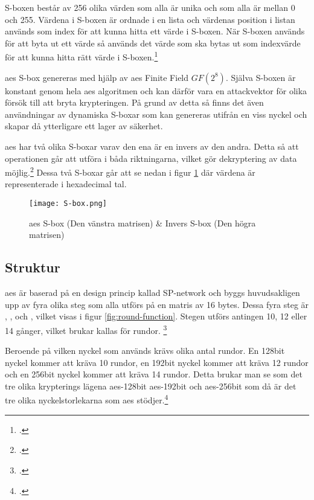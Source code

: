 S-boxen består av 256 olika värden som alla är unika och som alla är mellan 0 och 255.
Värdena i S-boxen är ordnade i en lista och värdenas position i listan används som
index för att kunna hitta ett värde i S-boxen. När S-boxen används för att byta ut
ett värde så används det värde som ska bytas ut som indexvärde för att kunna hitta
rätt värde i S-boxen.\footcite{sbox_wiki}

\acrshort{aes} S-box genereras med hjälp av \acrshort{aes} Finite Field {$GF(2^8)$}.
Själva S-boxen är konstant genom hela \acrshort{aes} algoritmen och kan därför
vara en attackvektor för olika försök till att bryta krypteringen. På grund av
detta så finns det även användningar av dynamiska S-boxar som kan genereras
utifrån en viss nyckel och skapar då ytterligare ett lager av säkerhet.

\acrshort{aes} har två olika S-boxar varav den ena är en invers av den andra.
Detta så att operationen går att utföra i båda riktningarna, vilket gör dekryptering
av data möjlig.\footcite{sbox_wiki} Dessa två S-boxar går att se nedan i figur \ref{fig:aes-sbox} där
värdena är representerade i \gls{hexadecimal} tal.

\begin{figure}[H]
    \texttt{[image: S-box.png]}
    \caption{\acrshort{aes} S-box (Den vänstra matrisen) \& Invers S-box (Den högra matrisen)}
    \label{fig:aes-sbox}
\end{figure}

\subsection{Struktur}
\label{sec:aes-structure}
\acrshort{aes} är baserad på en design princip kallad \gls{SP-network} och byggs huvudsakligen upp av fyra olika steg som alla utförs på en matris av 16 \glspl{byte}. Dessa fyra steg är
, ,  och
, vilket visas i figur \ref{fig:round-function}. Stegen utförs antingen 10, 12 eller 14 gånger, vilket brukar kallas för rundor.
\footcite{daemen1999aes}

Beroende på vilken nyckel som används krävs olika antal rundor.
En 128bit nyckel kommer att kräva 10 rundor, en 192bit nyckel kommer att kräva 12 rundor och en 256bit nyckel kommer att kräva 14 rundor.
Detta brukar man se som det tre olika krypterings lägena \acrshort{aes}-128bit \acrshort{aes}-192bit och \acrshort{aes}-256bit som
då är det tre olika nyckelstorlekarna som \acrshort{aes} stödjer.\footcite{daemen1999aes}

